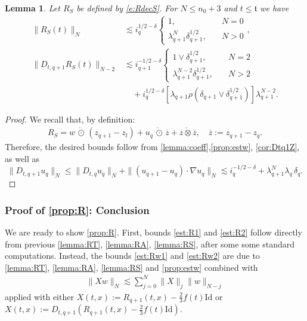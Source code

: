 \documentclass[10pt,a4paper]{amsart}
\numberwithin{equation}{section}
\numberwithin{corollario}{section}
\newtheorem{lemma}{Lemma}
\numberwithin{lemma}{section}
\numberwithin{prop}{section}
\theoremstyle{definition}
\theoremstyle{remark}
\newcommand{\Id}{\mathrm{Id}}
\newcommand{\varz}{\overline{z}}
\newcommand{\qq}{_{q+1}}
\newcommand{\SymOtNoTr}{\,\mathring{\odot}\,}
\begin{document}
\begin{lemma}\label{lemma:RS}
    Let $R_S$ be defined by \eqref{e:RdecS}. For $N\le n_0+3$ and $t\le \mathfrak{t}$ we have
    \begin{align}\label{est:RS}
        \|R_S(t)\|_N &\lesssim i_q^{1/2-\delta}\begin{cases}
            1,\,\quad&N=0\\
            \lambda\qq^N\delta\qq^{1/2},\quad&N>0
        \end{cases},\\
        \label{est:RS2} 
            \|D_{t,q+1}R_S(t)\|_{N-2}&\lesssim i\qq^{-1/2-\delta}
            \begin{cases}
                1\vee\delta\qq^{1/2},\quad&N=2\\
                \lambda\qq^{N-2}\delta\qq^{1/2},\quad &N>2
            \end{cases}
            \\
            &\quad
            +i_q^{1/2-\delta}\left[\lambda\qq\rho(\delta\qq\vee\delta\qq^{1/2})\right]\lambda\qq^{N-2}.
    \end{align}
\end{lemma}
\begin{proof}
    We recall that, by definition:
    \begin{align}
      R_S=w\SymOtNoTr (z\qq-z_l)+u_q\SymOtNoTr \varz+\varz\mathring{\otimes} \varz,
      \quad
      \varz := z\qq-z_q.  
    \end{align}
    Therefore, the desired bounds follow from \autoref{lemma:coeff},\autoref{prop:estw}, \autoref{cor:Dtq1Z}, as well as 
    \begin{equation}\label{est:Dtq1uq}
        \|D_{t,q+1}u_q\|_N\le \|D_{t,q}u_q\|_N+\|(u\qq-u_q)\cdot \nabla u_q\|_N\lesssim i_q^{-1/2-\delta}+\lambda\qq^N\lambda_q\,\delta_q.
    \end{equation}
\end{proof}

\subsubsection{Proof of \autoref{prop:R}: Conclusion}
We are ready to show \autoref{prop:R}.
First, bounds \eqref{est:R1} and \eqref{est:R2} follow directly from previous \autoref{lemma:RT}, \autoref{lemma:RA}, \autoref{lemma:RS}, after some some standard computations.
Instead, the bounds \eqref{est:Rw1}  and \eqref{est:Rw2} are due to \autoref{lemma:RT}, \autoref{lemma:RA}, \autoref{lemma:RS} and \autoref{prop:estw} combined with
\begin{align}
   \|Xw \|_N\lesssim\sum_{j=0}^N\|X \|_j\|w \|_{N-j} 
\end{align}
applied with either $X(t,x) :=R\qq(t,x)-\frac23f(t)\Id$ or $X(t,x):=D_{t,q+1}\left(R\qq(t,x)-\frac23f(t)\Id\right).$
\end{document}
